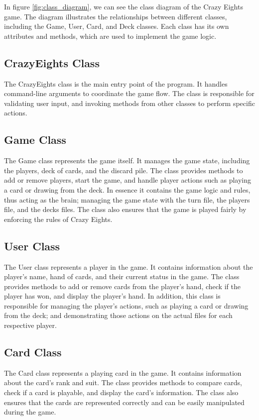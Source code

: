 \documentclass[conference]{IEEEtran}
\begin{document}
In figure \ref{fig:class_diagram}, we can see the class diagram of the Crazy Eights game. The diagram illustrates the relationships between different classes, including the Game, User, Card, and Deck classes. Each class has its own attributes and methods, which are used to implement the game logic.

\subsection{CrazyEights Class}
The CrazyEights class is the main entry point of the program. It handles command-line arguments to coordinate the game flow. The class is responsible for validating user input, and invoking methods from other classes to perform specific actions.

\subsection{Game Class}
The Game class represents the game itself. It manages the game state, including the players, deck of cards, and the discard pile. The class provides methods to add or remove players, start the game, and handle player actions such as playing a card or drawing from the deck. In essence it contains the game logic and rules, thus acting as the brain; managing the game state with the turn file, the players file, and the decks files. The class also ensures that the game is played fairly by enforcing the rules of Crazy Eights.

\subsection{User Class}
The User class represents a player in the game. It contains information about the player's name, hand of cards, and their current status in the game. The class provides methods to add or remove cards from the player's hand, check if the player has won, and display the player's hand. In addition, this class is responsible for managing the player's actions, such as playing a card or drawing from the deck; and demonstrating those actions on the actual files for each respective player.

\subsection{Card Class}
The Card class represents a playing card in the game. It contains information about the card's rank and suit. The class provides methods to compare cards, check if a card is playable, and display the card's information. The class also ensures that the cards are represented correctly and can be easily manipulated during the game.
\end{document}
